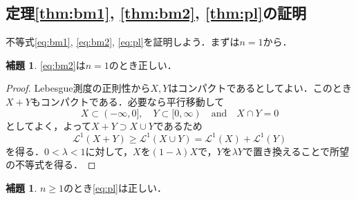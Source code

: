 \documentclass[a4j]{ltjsarticle}
\newcommand{\Lm}{\mathcal{L}}
\newcommand{\1}{\bm{1}}
\numberwithin{equation}{section}
\theoremstyle{definition}
\newtheorem{lem}[thm]{補題}
\begin{document}
\subsection{定理\ref{thm:bm1}, \ref{thm:bm2}, \ref{thm:pl}の証明}
不等式\eqref{eq:bm1}, \eqref{eq:bm2}, \eqref{eq:pl}を証明しよう．まずは$n=1$から．
\begin{lem}
    \eqref{eq:bm2}は$n=1$のとき正しい．
\end{lem}
\begin{proof}
    Lebesgue測度の正則性から$X,Y$はコンパクトであるとしてよい．このとき$X+Y$もコンパクトである．必要なら平行移動して
    \begin{equation}
        X\subset (-\infty,0],\quad Y\subset [0,\infty)\quad \text{and}\quad X\cap Y=\qty{0}
    \end{equation}
    としてよく，よって$X+Y\supset X\cup Y$であるため
    \begin{equation}
        \Lm^1(X+Y)\geq \Lm^1(X\cup Y)=\Lm^1(X)+\Lm^1(Y)
    \end{equation}
    を得る．$0<\lambda<1$に対して，$X$を$(1-\lambda)X$で，$Y$を$\lambda Y$で置き換えることで所望の不等式を得る．
\end{proof}
\begin{lem}\label{lem:proof_of_pl}
    $n\geq1$のとき\eqref{eq:pl}は正しい．
\end{lem}
\end{document}
